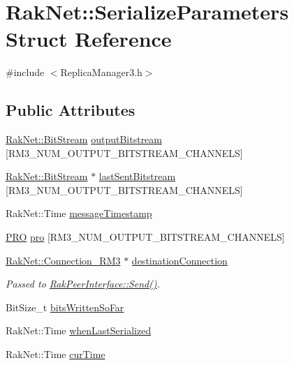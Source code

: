 \hypertarget{struct_rak_net_1_1_serialize_parameters}{\section{Rak\-Net\-:\-:Serialize\-Parameters Struct Reference}
\label{struct_rak_net_1_1_serialize_parameters}
}


{\ttfamily \#include $<$Replica\-Manager3.\-h$>$}

\subsection*{Public Attributes}
\begin{DoxyCompactItemize}
\item 
\hyperlink{class_rak_net_1_1_bit_stream}{Rak\-Net\-::\-Bit\-Stream} \hyperlink{struct_rak_net_1_1_serialize_parameters_ad7ab99674d6452c3d5a5ea6301da4a75}{output\-Bitstream} \mbox{[}R\-M3\-\_\-\-N\-U\-M\-\_\-\-O\-U\-T\-P\-U\-T\-\_\-\-B\-I\-T\-S\-T\-R\-E\-A\-M\-\_\-\-C\-H\-A\-N\-N\-E\-L\-S\mbox{]}
\item 
\hyperlink{class_rak_net_1_1_bit_stream}{Rak\-Net\-::\-Bit\-Stream} $\ast$ \hyperlink{struct_rak_net_1_1_serialize_parameters_a3f827fa6ae16ed1f35efddf5696ae4e9}{last\-Sent\-Bitstream} \mbox{[}R\-M3\-\_\-\-N\-U\-M\-\_\-\-O\-U\-T\-P\-U\-T\-\_\-\-B\-I\-T\-S\-T\-R\-E\-A\-M\-\_\-\-C\-H\-A\-N\-N\-E\-L\-S\mbox{]}
\item 
Rak\-Net\-::\-Time \hyperlink{struct_rak_net_1_1_serialize_parameters_aad0e0e02623bdf80d4e46b468b39a614}{message\-Timestamp}
\item 
\hyperlink{struct_rak_net_1_1_p_r_o}{P\-R\-O} \hyperlink{struct_rak_net_1_1_serialize_parameters_a3470c71391a99302bf89160c1c5a0c39}{pro} \mbox{[}R\-M3\-\_\-\-N\-U\-M\-\_\-\-O\-U\-T\-P\-U\-T\-\_\-\-B\-I\-T\-S\-T\-R\-E\-A\-M\-\_\-\-C\-H\-A\-N\-N\-E\-L\-S\mbox{]}
\item 
\hypertarget{struct_rak_net_1_1_serialize_parameters_a0faf31c40a78967d002d7deb2adfbf0b}{\hyperlink{class_rak_net_1_1_connection___r_m3}{Rak\-Net\-::\-Connection\-\_\-\-R\-M3} $\ast$ \hyperlink{struct_rak_net_1_1_serialize_parameters_a0faf31c40a78967d002d7deb2adfbf0b}{destination\-Connection}}\label{struct_rak_net_1_1_serialize_parameters_a0faf31c40a78967d002d7deb2adfbf0b}

\begin{DoxyCompactList}\small\item\em Passed to \hyperlink{class_rak_net_1_1_rak_peer_interface_a543ec5be9cf5f73f5c8733d1829789f9}{Rak\-Peer\-Interface\-::\-Send()}. \end{DoxyCompactList}\item 
Bit\-Size\-\_\-t \hyperlink{struct_rak_net_1_1_serialize_parameters_ac69a7436aa2040a35ba5c43079609321}{bits\-Written\-So\-Far}
\item 
Rak\-Net\-::\-Time \hyperlink{struct_rak_net_1_1_serialize_parameters_a9a81ebdebd1a5ed7726824d9da09cd61}{when\-Last\-Serialized}
\item 
Rak\-Net\-::\-Time \hyperlink{struct_rak_net_1_1_serialize_parameters_ad5a913a764faa0bf58e7503efbfd7233}{cur\-Time}
\end{DoxyCompactItemize}


